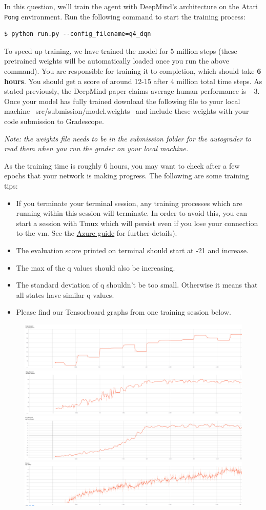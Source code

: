 \item {}

In this question, we'll train the agent with DeepMind's architecture on the Atari \texttt{Pong} environment. Run the following command to start the training process:
\begin{lstlisting}
$ python run.py --config_filename=q4_dqn
\end{lstlisting}
To speed up training, we have trained the model for 5 million steps (these pretrained weights will be automatically loaded once you run the above command). You are responsible for training it to completion, which should take \textbf{6 hours}. You should get a score of around 12-15 after 4 million total time steps.  As stated previously, the DeepMind paper claims average human performance is $ -3 $. Once your model has fully trained download the following file to your local machine ~src/submission/model.weights~ and include these weights with your code submission to Gradescope. 

\textit{Note: the weights file needs to be in the submission folder for the autograder to read them when you run the grader on your local machine.}


As the training time is roughly 6 hours, you may want to check after a few epochs that your network is making progress.  The following are some training tips:

\begin{itemize}
\item If you terminate your terminal session, any training processes which are running within this session will terminate.  In order to avoid this, you can start a session with Tmux which will persist even if you lose your connection to the vm. See the \href{https://github.com/scpd-proed/XCS234-Handouts/blob/main/Azure/Azure%20Guide.pdf}{Azure guide} for further details).
\item The evaluation score printed on terminal should start at -21 and increase.
\item The max of the q values should also be increasing.
\item The standard deviation of q shouldn't be too small. Otherwise it means that all states have similar q values.
\item Please find our Tensorboard graphs from one training session below.
\end{itemize}

\begin{figure}[H]
\centering
  \includegraphics[width=.4\linewidth]{images/Eval_R.png}
  \includegraphics[width=.4\linewidth]{images/Max_R.png}
  \includegraphics[width=.4\linewidth]{images/Avg_R.png}
  \includegraphics[width=.4\linewidth]{images/Max_Q.png}
\end{figure}